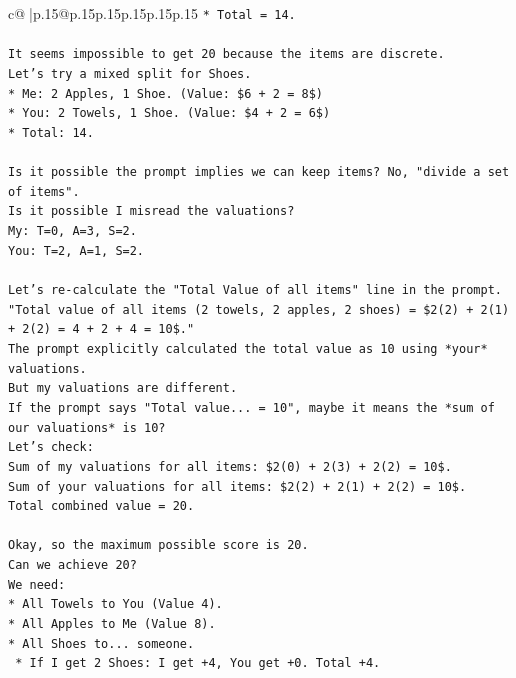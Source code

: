 \documentclass{article}
\begin{document}
{\begin{supertabular}{c@{$\;$}|p{.15\linewidth}@{}p{.15\linewidth}p{.15\linewidth}p{.15\linewidth}p{.15\linewidth}p{.15\linewidth}}
{{{\texttt{*   Total = 14.} \\
\\ 
\texttt{It seems impossible to get 20 because the items are discrete.} \\
\texttt{Let's try a mixed split for Shoes.} \\
\texttt{*   Me: 2 Apples, 1 Shoe. (Value: \$6 + 2 = 8\$)} \\
\texttt{*   You: 2 Towels, 1 Shoe. (Value: \$4 + 2 = 6\$)} \\
\texttt{*   Total: 14.} \\
\\ 
\texttt{Is it possible the prompt implies we can keep items? No, "divide a set of items".} \\
\texttt{Is it possible I misread the valuations?} \\
\texttt{My: T=0, A=3, S=2.} \\
\texttt{You: T=2, A=1, S=2.} \\
\\ 
\texttt{Let's re{-}calculate the "Total Value of all items" line in the prompt.} \\
\texttt{"Total value of all items (2 towels, 2 apples, 2 shoes) = \$2(2) + 2(1) + 2(2) = 4 + 2 + 4 = 10\$."} \\
\texttt{The prompt explicitly calculated the total value as 10 using *your* valuations.} \\
\texttt{But my valuations are different.} \\
\texttt{If the prompt says "Total value... = 10", maybe it means the *sum of our valuations* is 10?} \\
\texttt{Let's check:} \\
\texttt{Sum of my valuations for all items: \$2(0) + 2(3) + 2(2) = 10\$.} \\
\texttt{Sum of your valuations for all items: \$2(2) + 2(1) + 2(2) = 10\$.} \\
\texttt{Total combined value = 20.} \\
\\ 
\texttt{Okay, so the maximum possible score is 20.} \\
\texttt{Can we achieve 20?} \\
\texttt{We need:} \\
\texttt{*   All Towels to You (Value 4).} \\
\texttt{*   All Apples to Me (Value 8).} \\
\texttt{*   All Shoes to... someone.} \\
\texttt{    *   If I get 2 Shoes: I get +4, You get +0. Total +4.} \\
}}}
\end{supertabular}}
\end{document}
